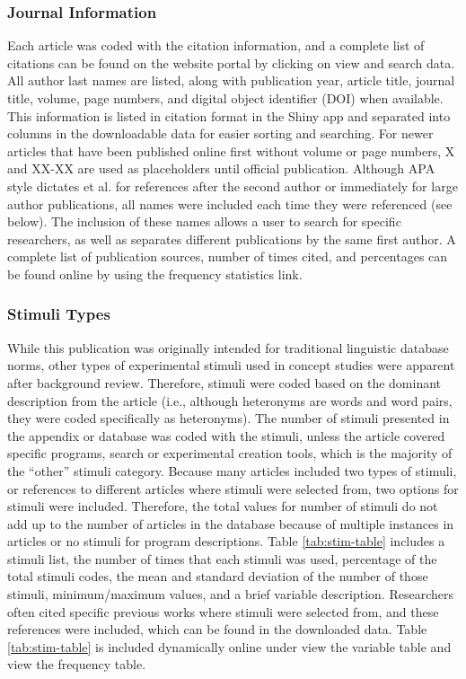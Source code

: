 \documentclass[english,man]{apa6}
\theoremstyle{definition}
\theoremstyle{definition}
\theoremstyle{definition}
\theoremstyle{remark}
\begin{document}
\subsubsection{Journal Information}\label{journal-information}

Each article was coded with the citation information, and a complete
list of citations can be found on the website portal by clicking on view
and search data. All author last names are listed, along with
publication year, article title, journal title, volume, page numbers,
and digital object identifier (DOI) when available. This information is
listed in citation format in the Shiny app and separated into columns in
the downloadable data for easier sorting and searching. For newer
articles that have been published online first without volume or page
numbers, X and XX-XX are used as placeholders until official
publication. Although APA style dictates et al. for references after the
second author or immediately for large author publications, all names
were included each time they were referenced (see below). The inclusion
of these names allows a user to search for specific researchers, as well
as separates different publications by the same first author. A complete
list of publication sources, number of times cited, and percentages can
be found online by using the frequency statistics link.

\subsubsection{Stimuli Types}\label{stimuli-types}

While this publication was originally intended for traditional
linguistic database norms, other types of experimental stimuli used in
concept studies were apparent after background review. Therefore,
stimuli were coded based on the dominant description from the article
(i.e., although heteronyms are words and word pairs, they were coded
specifically as heteronyms). The number of stimuli presented in the
appendix or database was coded with the stimuli, unless the article
covered specific programs, search or experimental creation tools, which
is the majority of the \enquote{other} stimuli category. Because many
articles included two types of stimuli, or references to different
articles where stimuli were selected from, two options for stimuli were
included. Therefore, the total values for number of stimuli do not add
up to the number of articles in the database because of multiple
instances in articles or no stimuli for program descriptions. Table
\ref{tab:stim-table} includes a stimuli list, the number of times that
each stimuli was used, percentage of the total stimuli codes, the mean
and standard deviation of the number of those stimuli, minimum/maximum
values, and a brief variable description. Researchers often cited
specific previous works where stimuli were selected from, and these
references were included, which can be found in the downloaded data.
Table \ref{tab:stim-table} is included dynamically online under view the
variable table and view the frequency table.
\end{document}

